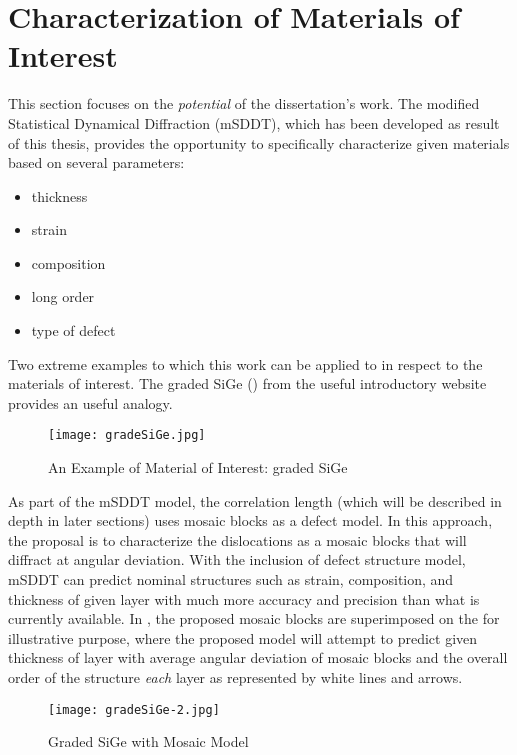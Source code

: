 \section{Characterization of Materials of Interest}

This section focuses on the \emph{potential} of the dissertation's work.  The modified Statistical Dynamical Diffraction (mSDDT), which has been developed as result of this thesis, provides the opportunity to specifically characterize given materials based on several parameters:

{\SingleSpacing
\begin{itemize}
\item{thickness}
\item{strain}
\item{composition}
\item{long order}
\item{type of defect}
\end{itemize}}

Two extreme examples to which this work can be applied to in respect to the materials of interest.  The graded SiGe () from the useful introductory website \cite{Fig2-2} provides an useful analogy.

\begin{figure}[h]
\caption{An Example of Material of Interest: graded SiGe}
\label{gradeSiGe}
\centering
\texttt{[image: gradeSiGe.jpg]}
\end{figure}

As part of the mSDDT model, the correlation length (which will be described in depth in later sections) uses mosaic blocks as a defect model.  In this approach, the proposal is to characterize the dislocations as a mosaic blocks that will diffract  at angular deviation.  With the inclusion of defect structure model, mSDDT can predict nominal structures such as strain, composition, and thickness of given layer with much more accuracy and precision than what is currently available.  In , the proposed mosaic blocks are superimposed on the  for illustrative purpose, where the proposed model will attempt to predict given thickness of layer with average angular deviation of mosaic blocks and the overall order of the structure \emph{each} layer as represented by white lines and arrows.

\begin{figure}[h]
\caption{Graded SiGe with Mosaic Model}
\label{gradeSiGe2}
\centering
\texttt{[image: gradeSiGe-2.jpg]}
\end{figure}

